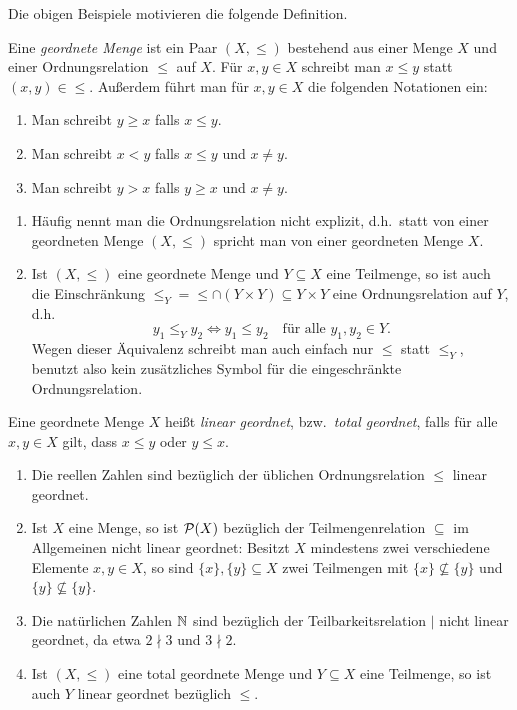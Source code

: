 Die obigen Beispiele motivieren die folgende Definition.

\begin{defi}
 Eine \emph{geordnete Menge} ist ein Paar $(X,\leq)$ bestehend aus einer Menge $X$ und einer Ordnungsrelation $\leq$ auf $X$. Für $x,y \in X$ schreibt man $x \leq y$ statt $(x,y) \in \leq$. Außerdem führt man für $x,y \in X$ die folgenden Notationen ein:
 \begin{enumerate}[label=\roman*)]
  \item
   Man schreibt $y \geq x$ falls $x \leq y$.
  \item
   Man schreibt $x < y$ falls $x \leq y$ und $x \neq y$.
  \item
   Man schreibt $y > x$ falls $y \geq x$ und $x \neq y$.
 \end{enumerate}
\end{defi}

\begin{bem}
 \begin{enumerate}[leftmargin=*]
  \item
   Häufig nennt man die Ordnungsrelation nicht explizit, d.h.\ statt von einer geordneten Menge $(X,\leq)$ spricht man von einer geordneten Menge $X$.
  \item
   Ist $(X,\leq)$ eine geordnete Menge und $Y \subseteq X$ eine Teilmenge, so ist auch die Einschränkung $\leq_Y = \leq \cap (Y \times Y) \subseteq Y \times Y$ eine Ordnungsrelation auf $Y$, d.h.\
   \[
    y_1 \leq_Y y_2 \iff y_1 \leq y_2
    \quad
    \text{für alle $y_1, y_2 \in Y$}.
   \]
   Wegen dieser Äquivalenz schreibt man auch einfach nur $\leq$ statt $\leq_Y$, benutzt also kein zusätzliches Symbol für die eingeschränkte Ordnungsrelation.
 \end{enumerate}
\end{bem}

\begin{defi}
 Eine geordnete Menge $X$ heißt \emph{linear geordnet}, bzw.\ \emph{total geordnet}, falls für alle $x,y \in X$ gilt, dass $x \leq y$ oder $y \leq x$.
\end{defi}

\begin{bsp}
 \begin{enumerate}[leftmargin=*]
  \item
   Die reellen Zahlen sind bezüglich der üblichen Ordnungsrelation $\leq$ linear geordnet.
  \item
   Ist $X$ eine Menge, so ist $\mathcal{P}(X)$ bezüglich der Teilmengenrelation $\subseteq$ im Allgemeinen nicht linear geordnet: Besitzt $X$ mindestens zwei verschiedene Elemente $x,y \in X$, so sind $\{x\}, \{y\} \subseteq X$ zwei Teilmengen mit $\{x\} \nsubseteq \{y\}$ und $\{y\} \nsubseteq \{y\}$.
  \item
   Die natürlichen Zahlen $\mathbb{N}$ sind bezüglich der Teilbarkeitsrelation $|$ nicht linear geordnet, da etwa $2 \nmid 3$ und $3 \nmid 2$.
  \item
   Ist $(X,\leq)$ eine total geordnete Menge und $Y \subseteq X$ eine Teilmenge, so ist auch $Y$ linear geordnet bezüglich $\leq$.
 \end{enumerate}
\end{bsp}

